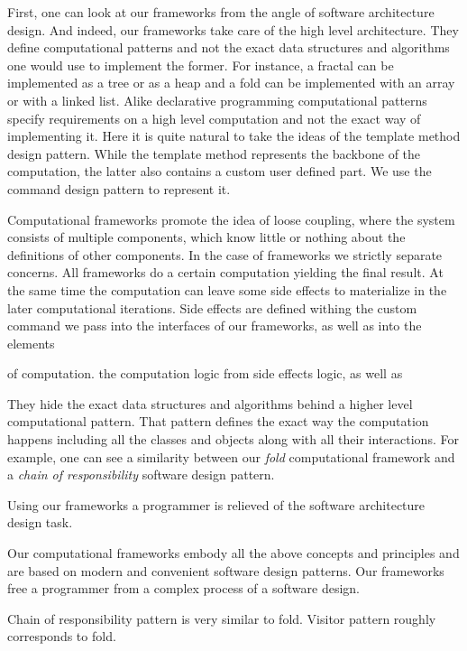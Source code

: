 First, one can look at our frameworks from the angle of software architecture design. And indeed, our frameworks take care of the high level architecture. They define computational patterns and not the exact data structures and algorithms one would use to implement the former. For instance, a fractal can be implemented as a tree or as a heap and a fold can be implemented with an array or with a linked list. Alike declarative programming computational patterns specify requirements on a high level computation and not the exact way of implementing it. Here it is quite natural to take the ideas of the template method design pattern. While the template method represents the backbone of the computation, the latter also contains a custom user defined part. We use the command design pattern to represent it.       

Computational frameworks promote the idea of loose coupling, where the system consists of multiple components, which know little or nothing about the definitions of other components. In the case of frameworks we strictly separate concerns. All frameworks do a certain computation yielding the final result. At the same time the computation can leave some side effects to materialize in the later computational iterations. Side effects are defined withing the custom command we pass into the interfaces of our frameworks, as well as into the elements  


of computation.  the computation logic from side effects logic, as well as    


They hide the exact data structures and algorithms behind a higher level computational pattern. That pattern defines the exact way the computation happens including all the classes and objects along with all their interactions. For example, one can see a similarity between our \textit{fold} computational framework and a \textit{chain of responsibility} software design pattern.

Using our frameworks a programmer is relieved of the software architecture design task.


Our computational frameworks embody all the above concepts and principles and are based on modern and convenient software design patterns. Our frameworks free a programmer from a complex process of a software design.  

Chain of responsibility pattern is very similar to fold.
Visitor pattern roughly corresponds to fold.

